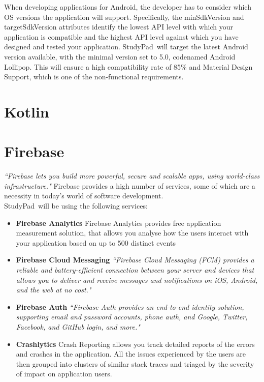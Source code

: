 \documentclass[thesis=B,english]{FITthesis}[2012/10/20]
\newcommand{\appname}{StudyPad}
\newcommand{\quoting}[1]{\textit{``#1"}}
\begin{document}
When developing applications for Android, the developer has to consider which OS versions the application will support. Specifically, the minSdkVersion and targetSdkVersion attributes  identify the lowest API level with which your application is compatible and the highest API level against which you have designed and tested your application. \appname\ will target the latest Android version available, with the minimal version set to 5.0, codenamed Android Lollipop. This will ensure a high compatibility rate of 85\% and Material Design Support, which is one of the non-functional requirements.


\section{Kotlin}



\section{Firebase}

\quoting{Firebase lets you build more powerful, secure and scalable apps, using world-class infrastructure.} \cite{firebase} Firebase provides a high number of services, some of which are a necessity in today's world of software development. \\\appname\ will be using the following services:
\begin{itemize}
	\item \textbf{Firebase Analytics} Firebase Analytics provides free application measurement solution, that allows you analyse how the users interact with your application based  on up to 500 distinct events \cite{firebase-analytics}
		\item \textbf{Firebase Cloud Messaging} \quoting{Firebase Cloud Messaging (FCM) provides a reliable and battery-efficient connection between your server and devices that allows you to deliver and receive messages and notifications on iOS, Android, and the web at no cost.}\cite{firebase-messaging}
	\item \textbf{Firebase Auth} \quoting{Firebase Auth  provides an end-to-end identity solution, supporting email and password accounts, phone auth, and Google, Twitter, Facebook, and GitHub login, and more.}\cite{firebase-auth}
	\item \textbf{Crashlytics} Crash Reporting allows you track detailed reports of the errors and crashes in the application. All the issues experienced by the users are then grouped into clusters of similar stack traces and triaged by the severity of impact on application users.\cite{firebase-crash}

\end{itemize}
\end{document}
